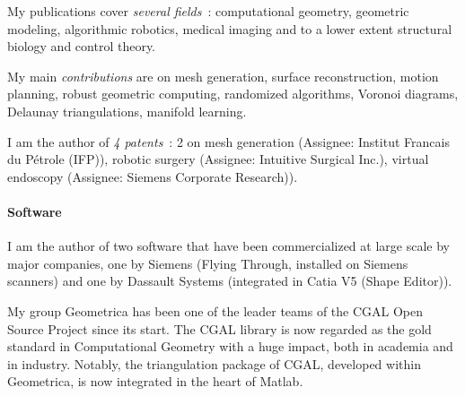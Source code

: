 My publications cover {\em several fields}~: computational geometry, geometric modeling, algorithmic robotics, medical imaging and to a lower extent structural biology and control theory.

My main {\em contributions} are on  mesh generation, surface reconstruction, motion planning, robust geometric computing, randomized algorithms, Voronoi diagrams, Delaunay triangulations, manifold learning.

I am the author of {\em 4 patents}~: 2 on mesh generation (Assignee: Institut Francais du P\'etrole (IFP)), robotic surgery (Assignee: Intuitive Surgical Inc.), virtual endoscopy (Assignee: Siemens Corporate Research)).

\paragraph{Software} \mbox{}

I am the author of two software that have been commercialized at large scale by major companies, one by Siemens (Flying Through, installed on Siemens scanners) and one by Dassault Systems (integrated in Catia V5 (Shape Editor)). 

My group Geometrica has been one of the leader teams of  the CGAL Open Source Project since its start.  The CGAL library  is now regarded as the gold standard in Computational Geometry with a huge impact, both in academia and in industry. Notably, the triangulation package of CGAL, developed within Geometrica, is now integrated in the heart of Matlab.










